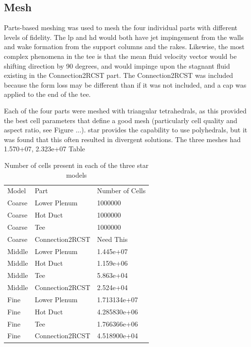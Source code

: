 \documentclass[double,12pt]{beavtex}
\begin{document}
\subsection{Mesh}

Parts-based meshing was used to mesh the four individual parts with different levels of fidelity. The \acrshort{lp} and \acrshort{hd} would both have jet impingement from the walls and wake formation from the support columns and the rakes. Likewise, the most complex phenomena in the tee is that the mean fluid velocity vector would be shifting direction by 90 degrees, and would impinge upon the stagnant fluid existing in the Connection2RCST part. The Connection2RCST was included because the form loss may be different than if it was not included, and a cap was applied to the end of the tee. 

Each of the four parts were meshed with triangular tetrahedrals, as this provided the best cell parameters that define a good mesh (particularly cell quality and aspect ratio, see Figure ...). \acrshort{star} provides the capability to use polyhedrals, but it was found that this often resulted in divergent solutions. The three meshes had 1.570+07, 2.323e+07 Table 

\begin{table}[!ht]\centering
\abovedisplayskip=0pt
\belowdisplayskip=0pt
\begin{tabular}{ m{4cm} m{4cm} m{4cm} }\hline
Model & Part & Number of Cells \\
Coarse & Lower Plenum & 1000000 \\
Coarse & Hot Duct & 1000000 \\
Coarse & Tee & 1000000 \\
Coarse & Connection2RCST & Need This \\
Middle & Lower Plenum & 1.445e+07 \\
Middle & Hot Duct & 1.159e+06 \\
Middle & Tee & 5.863e+04 \\
Middle & Connection2RCST & 2.524e+04 \\
Fine & Lower Plenum & 1.713134e+07  \\
Fine & Hot Duct & 4.285830e+06 \\
Fine & Tee & 1.766366e+06 \\
Fine & Connection2RCST & 4.518900e+04 \\
\hline\end{tabular}\caption{Number of cells present in each of the three \acrshort{star} models}\label{Number_Cells_STAR_Model}\end{table}
\end{document}
